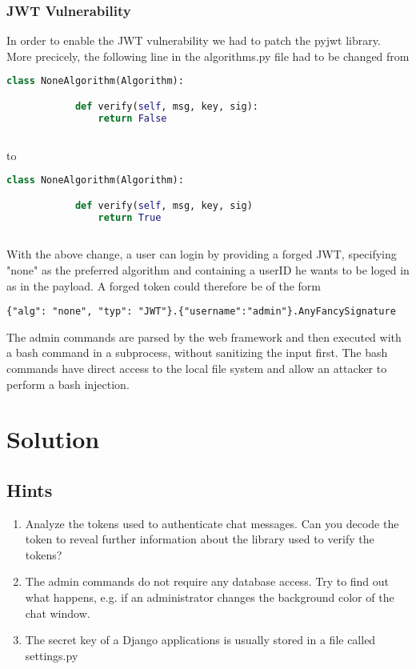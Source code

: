 \documentclass[12pt,a4paper]{article}
\begin{document}
\subsubsection{JWT Vulnerability}
In order to enable the JWT vulnerability we had to patch the pyjwt library. More precicely, the following line in the algorithms.py file had to be changed from

\begin{lstlisting}[language=python]
        class NoneAlgorithm(Algorithm):

            def verify(self, msg, key, sig):
                return False
 
 \end{lstlisting}
 to 
 \begin{lstlisting}[language=python]
        class NoneAlgorithm(Algorithm):

            def verify(self, msg, key, sig)
                return True
  
  \end{lstlisting}
 
 With the above change, a user can login by providing a forged JWT, specifying "none" as the preferred algorithm and containing a userID he wants to be loged in as in the payload. A forged token could therefore be of the form
 \begin{verbatim}
{"alg": "none", "typ": "JWT"}.{"username":"admin"}.AnyFancySignature
  \end{verbatim}

 
 The admin commands are parsed by the web framework and then executed with a bash command in a subprocess, without sanitizing the input first. The bash commands have direct access to the local file system and allow an attacker to perform a bash injection.

\section{Solution}

\subsection{Hints}
\begin{enumerate}
	\item Analyze the tokens used to authenticate chat messages. Can you decode the token to reveal further information about the library used to verify the tokens?
	\item The admin commands do not require any database access. Try to find out what happens, e.g. if an administrator changes the background color of the chat window.
	\item The secret key of a Django applications is usually stored in a file called settings.py
\end{enumerate}
\end{document}
